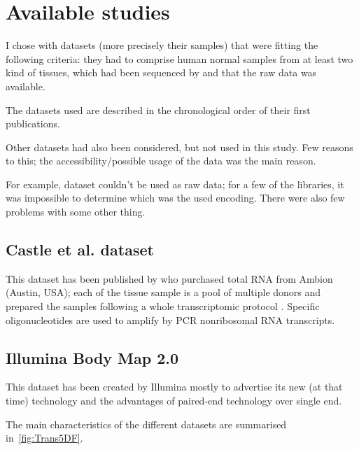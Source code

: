 \section{Available studies}
\label{sec:Trans_AvailableStudies}

I chose with datasets (more precisely their samples) that were fitting the
following criteria: they had to comprise human normal samples from at least
two kind of tissues, which had been sequenced by \Rnaseq and that the raw data was
available.

The datasets used are described in the chronological order of their first publications.

Other datasets had also been considered, but not used in this study. Few reasons to
this; the accessibility/possible usage of the data was the main reason.

For example, \citet{Burge} dataset couldn't be used as raw data; for a few of the
libraries, it was impossible to determine which was the used encoding. There were
also few problems with some other thing.

\subsection{Castle et al. dataset}

This dataset has been published by \citet*{castleData} who purchased total \gls{RNA}
from Ambion (Austin, USA); each of the tissue sample is a pool of multiple donors
and prepared the samples following a whole transcriptomic protocol \citep{Armour:2009}.
Specific oligonucleotides are used to amplify by \gls{PCR} nonribosomal \gls{RNA}
transcripts.


\subsection{Illumina Body Map 2.0}

This dataset has been created by Illumina mostly to advertise its new (at that time)
technology and the advantages of paired-end technology over single end.
\citep{illuminaBM}


The main characteristics of the different datasets are summarised
in~\cref{fig:Trans5DF}.

